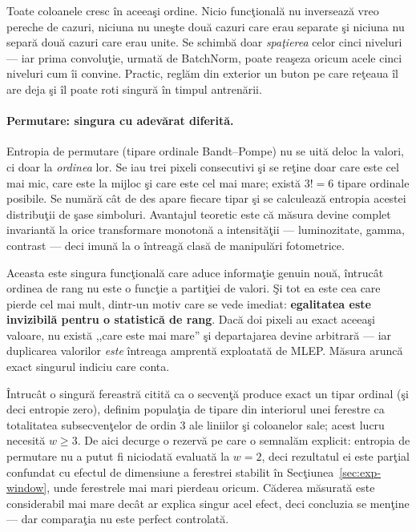 Toate coloanele cresc în aceeaşi ordine. Nicio funcţională nu inversează vreo
pereche de cazuri, niciuna nu uneşte două cazuri care erau separate şi niciuna
nu separă două cazuri care erau unite. Se schimbă doar \emph{spaţierea} celor
cinci niveluri --- iar prima convoluţie, urmată de BatchNorm, poate reaşeza
oricum acele cinci niveluri cum îi convine. Practic, reglăm din exterior un buton
pe care reţeaua îl are deja şi îl poate roti singură în timpul antrenării.

\paragraph{Permutare: singura cu adevărat diferită.} Entropia de permutare
(tipare ordinale Bandt--Pompe) nu se uită deloc la valori, ci doar la
\emph{ordinea} lor. Se iau trei pixeli consecutivi şi se reţine doar care este
cel mai mic, care este la mijloc şi care este cel mai mare; există $3! = 6$
tipare ordinale posibile. Se numără cât de des apare fiecare tipar şi se
calculează entropia acestei distribuţii de şase simboluri. Avantajul teoretic
este că măsura devine complet invariantă la orice transformare monotonă a
intensităţii --- luminozitate, gamma, contrast --- deci imună la o întreagă clasă
de manipulări fotometrice.

Aceasta este singura funcţională care aduce informaţie genuin nouă, întrucât
ordinea de rang nu este o funcţie a partiţiei de valori. Şi tot ea este cea care
pierde cel mai mult, dintr-un motiv care se vede imediat: \textbf{egalitatea este
invizibilă pentru o statistică de rang}. Dacă doi pixeli au exact aceeaşi
valoare, nu există ,,care este mai mare'' şi departajarea devine arbitrară --- iar
duplicarea valorilor \emph{este} întreaga amprentă exploatată de MLEP. Măsura
aruncă exact singurul indiciu care conta.

Întrucât o singură fereastră citită ca o secvenţă produce exact un tipar ordinal
(şi deci entropie zero), definim populaţia de tipare din interiorul unei ferestre
ca totalitatea subsecvenţelor de ordin 3 ale liniilor şi coloanelor sale; acest
lucru necesită $w \geq 3$. De aici decurge o rezervă pe care o semnalăm explicit:
entropia de permutare nu a putut fi niciodată evaluată la $w=2$, deci rezultatul
ei este parţial confundat cu efectul de dimensiune a ferestrei stabilit în
Secţiunea~\ref{sec:exp-window}, unde ferestrele mai mari pierdeau oricum.
Căderea măsurată este considerabil mai mare decât ar explica singur acel efect,
deci concluzia se menţine --- dar comparaţia nu este perfect controlată.

